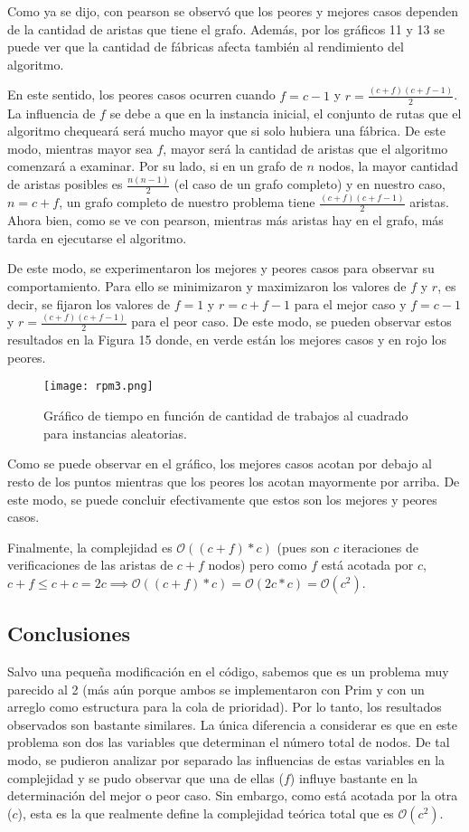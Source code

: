 \documentclass[A4paper,oneside,fleqn,11pt]{article}
\theoremstyle{definition}
\begin{document}
Como ya se dijo, con pearson se observó que los peores y mejores casos dependen de la cantidad de aristas que tiene el grafo. Además, por los gráficos 11 y 13 se puede ver que la cantidad de fábricas afecta también al rendimiento del algoritmo.

En este sentido, los peores casos ocurren cuando $f=c-1$ y $r=\frac{(c+f)(c+f-1)}{2}$. La influencia de $f$ se debe a que en la instancia inicial, el conjunto de rutas que el algoritmo chequeará será mucho mayor que si solo hubiera una fábrica. De este modo, mientras mayor sea $f$, mayor será la cantidad de aristas que el algoritmo comenzará a examinar. Por su lado, si en un grafo de $n$ nodos, la mayor cantidad de aristas posibles es $\frac{n(n-1)}{2}$ (el caso de un grafo completo) y en nuestro caso, $n=c+f$, un grafo completo de nuestro problema tiene $\frac{(c+f)(c+f-1)}{2}$ aristas. Ahora bien, como se ve con pearson, mientras más aristas hay en el grafo, más tarda en ejecutarse el algoritmo.

De este modo, se experimentaron los mejores y peores casos para observar su comportamiento. Para ello se minimizaron y maximizaron los valores de $f$ y $r$, es decir, se fijaron los valores de $f=1$ y $r=c+f-1$ para el mejor caso y $f=c-1$ y $r=\frac{(c+f)(c+f-1)}{2}$ para el peor caso. De este modo, se pueden observar estos resultados en la Figura 15 donde, en verde están los mejores casos y en rojo los peores.


\begin{figure}[h!]
\centering
\texttt{[image: rpm3.png]}
\caption{Gráfico de tiempo en función de cantidad de trabajos al cuadrado para instancias aleatorias.}
\end{figure}

Como se puede observar en el gráfico, los mejores casos acotan por debajo al resto de los puntos mientras que los peores los acotan mayormente por arriba. De este modo, se puede concluir efectivamente que estos son los mejores y peores casos.

Finalmente, la complejidad es $\mathcal{O} ((c+f)*c)$ (pues son $c$ iteraciones de verificaciones de las aristas de $c+f$ nodos) pero como $f$ está acotada por $c$, $c+f \leq c+c = 2c \implies \mathcal{O} ((c+f)*c) = \mathcal{O} (2c*c) = \mathcal{O} (c^2)$.


\subsection{Conclusiones}

Salvo una pequeña modificación en el código, sabemos que es un problema muy parecido al 2 (más aún porque ambos se implementaron con Prim y con un arreglo como estructura para la cola de prioridad). Por lo tanto, los resultados observados son bastante similares. La única diferencia a considerar es que en este problema son dos las variables que determinan el número total de nodos. De tal modo, se pudieron analizar por separado las influencias de estas variables en la complejidad y se pudo observar que una de ellas ($f$) influye bastante en la determinación del mejor o peor caso. Sin embargo, como está acotada por la otra ($c$), esta es la que realmente define la complejidad teórica total que es $\mathcal{O} (c^2)$.
\end{document}
